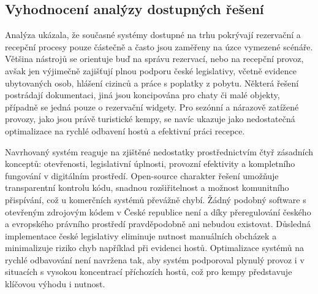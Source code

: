 \subsection{Vyhodnocení analýzy dostupných řešení}
Analýza ukázala, že současné systémy dostupné na trhu pokrývají rezervační a recepční procesy pouze částečně a často jsou zaměřeny na úzce vymezené scénáře.
Většina nástrojů se orientuje buď na správu rezervací, nebo na recepční provoz, avšak jen výjimečně zajišťují plnou podporu české legislativy, včetně evidence ubytovaných osob, hlášení cizinců a práce s poplatky z pobytu.
Některá řešení postrádají dokumentaci, jiná jsou koncipována pro chaty či malé objekty, případně se jedná pouze o rezervační widgety.
Pro sezónní a nárazově zatížené provozy, jako jsou právě turistické kempy, se navíc ukazuje jako nedostatečná optimalizace na rychlé odbavení hostů a efektivní práci recepce.

Navrhovaný systém reaguje na zjištěné nedostatky prostřednictvím čtyř zásadních konceptů: otevřenosti, legislativní úplnosti, provozní efektivity a kompletního fungování v digitálním prostředí.
Open-source charakter řešení umožňuje transparentní kontrolu kódu, snadnou rozšiřitelnost a možnost komunitního přispívání, což u komerčních systémů převážně chybí.
Žádný podobný software s otevřeným zdrojovým kódem v České republice není a díky přeregulování českého a evropského právního prostředí pravděpodobně ani nebudou existovat.
Důsledná implementace české legislativy eliminuje nutnost manuálních obcházek a minimalizuje riziko chyb například při evidenci hostů.
Optimalizace systémů na rychlé odbavování není navržena tak, aby systém podporoval plynulý provoz i v situacích s vysokou koncentrací příchozích hostů, což pro kempy představuje klíčovou výhodu i nutnost.
